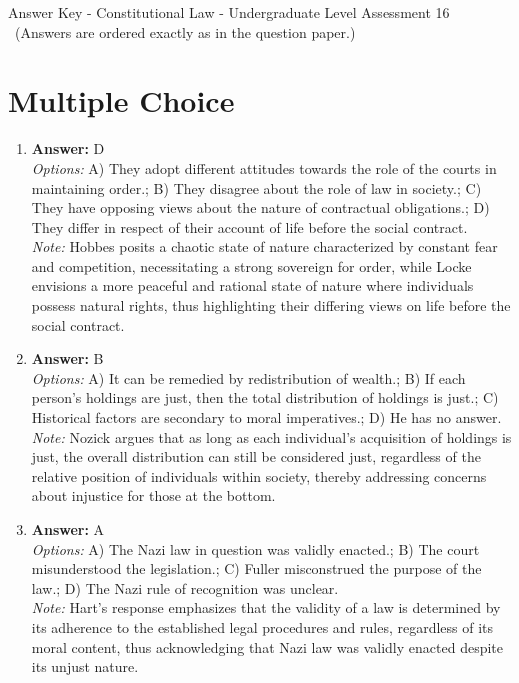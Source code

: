 \documentclass[12pt]{article}
\begin{document}
\begin{center}
Answer Key - Constitutional Law - Undergraduate Level Assessment 16 \
\small (Answers are ordered exactly as in the question paper.)
\end{center}

\section*{Multiple Choice}
\begin{enumerate}[label=\arabic*.]
\item \textbf{Answer:} D
\\ \textit{Options:} A) They adopt different attitudes towards the role of the courts in maintaining order.; B) They disagree about the role of law in society.; C) They have opposing views about the nature of contractual obligations.; D) They differ in respect of their account of life before the social contract.
\\ \textit{Note:} Hobbes posits a chaotic state of nature characterized by constant fear and competition, necessitating a strong sovereign for order, while Locke envisions a more peaceful and rational state of nature where individuals possess natural rights, thus highlighting their differing views on life before the social contract.
\item \textbf{Answer:} B
\\ \textit{Options:} A) It can be remedied by redistribution of wealth.; B) If each person's holdings are just, then the total distribution of holdings is just.; C) Historical factors are secondary to moral imperatives.; D) He has no answer.
\\ \textit{Note:} Nozick argues that as long as each individual's acquisition of holdings is just, the overall distribution can still be considered just, regardless of the relative position of individuals within society, thereby addressing concerns about injustice for those at the bottom.
\item \textbf{Answer:} A
\\ \textit{Options:} A) The Nazi law in question was validly enacted.; B) The court misunderstood the legislation.; C) Fuller misconstrued the purpose of the law.; D) The Nazi rule of recognition was unclear.
\\ \textit{Note:} Hart's response emphasizes that the validity of a law is determined by its adherence to the established legal procedures and rules, regardless of its moral content, thus acknowledging that Nazi law was validly enacted despite its unjust nature.

\end{enumerate}
\end{document}
